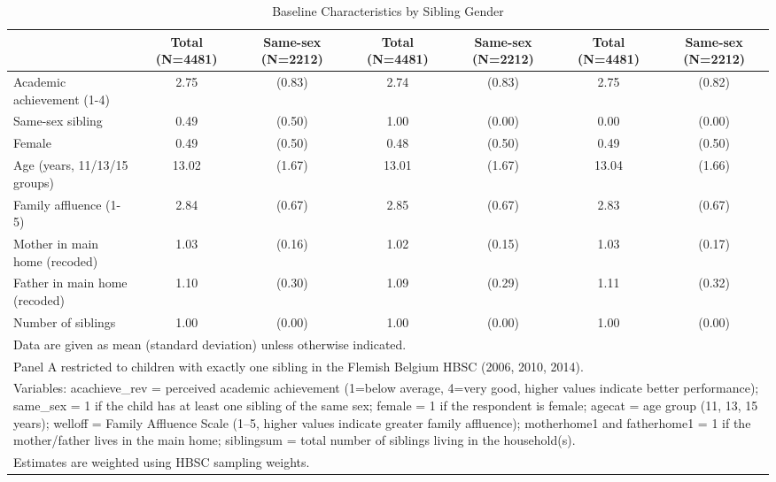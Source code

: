 \begin{table}[htbp]\centering
\def\sym#1{\ifmmode^{#1}\else\(^{#1}\)\fi}
\caption{Baseline Characteristics by Sibling Gender\label{tab:descriptives}}
\begin{tabular}{l*{3}{cc}}
\hline\hline
                    &Total (N=4481)&Same-sex (N=2212)&Total (N=4481)&Same-sex (N=2212)&Total (N=4481)&Same-sex (N=2212)\\
\hline
Academic achievement (1-4)&        2.75&      (0.83)&        2.74&      (0.83)&        2.75&      (0.82)\\
Same-sex sibling    &        0.49&      (0.50)&        1.00&      (0.00)&        0.00&      (0.00)\\
Female              &        0.49&      (0.50)&        0.48&      (0.50)&        0.49&      (0.50)\\
Age (years, 11/13/15 groups)&       13.02&      (1.67)&       13.01&      (1.67)&       13.04&      (1.66)\\
Family affluence (1-5)&        2.84&      (0.67)&        2.85&      (0.67)&        2.83&      (0.67)\\
Mother in main home (recoded)&        1.03&      (0.16)&        1.02&      (0.15)&        1.03&      (0.17)\\
Father in main home (recoded)&        1.10&      (0.30)&        1.09&      (0.29)&        1.11&      (0.32)\\
Number of siblings  &        1.00&      (0.00)&        1.00&      (0.00)&        1.00&      (0.00)\\
\hline\hline
\multicolumn{7}{l}{\footnotesize Data are given as mean (standard deviation) unless otherwise indicated.}\\
\multicolumn{7}{l}{\footnotesize Panel A restricted to children with exactly one sibling in the Flemish Belgium HBSC (2006, 2010, 2014).}\\
\multicolumn{7}{l}{\footnotesize Variables: acachieve\_rev = perceived academic achievement (1=below average, 4=very good, higher values indicate better performance); same\_sex = 1 if the child has at least one sibling of the same sex; female = 1 if the respondent is female; agecat = age group (11, 13, 15 years); welloff = Family Affluence Scale (1–5, higher values indicate greater family affluence); motherhome1 and fatherhome1 = 1 if the mother/father lives in the main home; siblingsum = total number of siblings living in the household(s).}\\
\multicolumn{7}{l}{\footnotesize Estimates are weighted using HBSC sampling weights.}\\
\end{tabular}
\end{table}